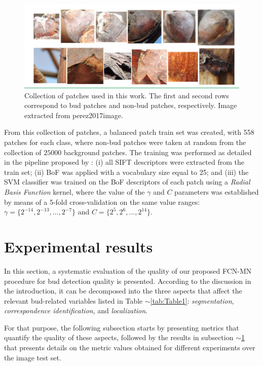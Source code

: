 \documentclass[a4paper,authoryear,review]{elsarticle}
\begin{document}
	
	\begin{figure}
		\centering
		\includegraphics[width=12cm]{figures/Figure2.png}
		\caption{
			Collection of patches used in this work. The first and second rows correspond to bud patches and non-bud patches, respectively. Image extracted from {perez2017image}.
		}
		\label{fig:Figure2}
	\end{figure}
	
	
	From this collection of patches, a balanced patch train set was created, with 558 patches for  each class, where non-bud patches were taken at random from the collection of $25000$ background patches. The training was performed as detailed in the pipeline proposed by \citet{perez2017image}: (i) all SIFT descriptors were extracted from the train set; (ii) BoF was applied with a vocabulary size equal to 25; and (iii) the SVM classifier was trained on the BoF descriptors of each patch using a \emph{Radial Basis Function} kernel, where the value of the $\gamma$ and $C$ parameters was established by means of a 5-fold cross-validation on the same value ranges: $\gamma = \{2^{-14}, 2^{-13}, \ldots, 2^{-7}\}$ and $C = \{2^{5}, 2^{6},\ldots , 2^{14}\}$.
	
	\section{Experimental results} 
	\label{sec:results}
	
	In this section, a systematic evaluation of the quality of our proposed FCN-MN procedure for bud detection quality is presented. According to the discussion in the introduction, it can be decomposed into the three aspects that affect the relevant bud-related variables listed in Table $\sim$\ref{tab:Table1}: \emph{segmentation}, \emph{correspondence identification}, and \emph{localization}. 
	
	For that purpose, the following subsection starts by presenting metrics that quantify the quality of these aspects, followed by the results in subsection $\sim$\ref{sec:results} that presents details on the metric values obtained for different experiments over the image test set. 
	
\end{document}

